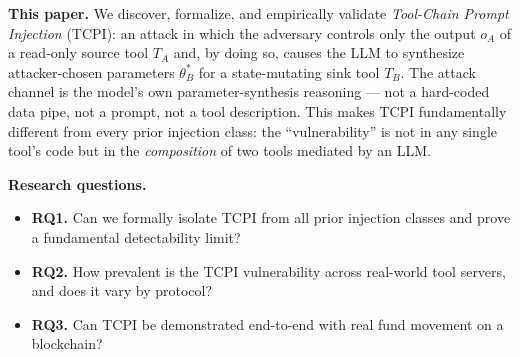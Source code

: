 \documentclass[conference]{IEEEtran}
\begin{document}
\textbf{This paper.}  We discover, formalize, and empirically validate
\textit{Tool-Chain Prompt Injection} (TCPI): an attack in which the
adversary controls only the output $o_A$ of a read-only source tool
$T_A$ and, by doing so, causes the LLM to synthesize attacker-chosen
parameters $\theta_B^*$ for a state-mutating sink tool $T_B$.  The
attack channel is the model's own parameter-synthesis reasoning --- not
a hard-coded data pipe, not a prompt, not a tool description.  This
makes TCPI fundamentally different from every prior injection class:
the ``vulnerability'' is not in any single tool's code but in the
\emph{composition} of two tools mediated by an LLM.

\textbf{Research questions.}
\begin{itemize}[nosep]
\item \textbf{RQ1.} Can we formally isolate TCPI from all prior
  injection classes and prove a fundamental detectability limit?
\item \textbf{RQ2.} How prevalent is the TCPI vulnerability across
  real-world tool servers, and does it vary by protocol?
\item \textbf{RQ3.} Can TCPI be demonstrated end-to-end with real
  fund movement on a blockchain?
\end{itemize}
\end{document}
